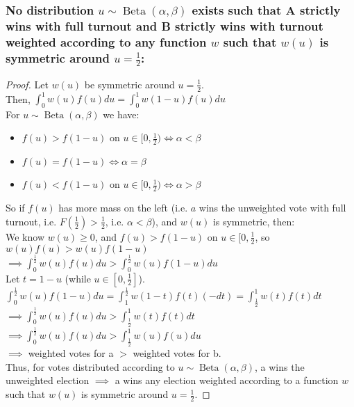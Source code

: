 \documentclass[12pt]{article}
\begin{document}
\subsubsection*{No distribution $u \sim \operatorname{Beta}(\alpha, \beta)$ exists such that A strictly wins with full turnout and B strictly wins with turnout weighted according to any function $w$ such that $w(u)$ is symmetric around $u = \frac{1}{2}$:}
\begin{proof}
    \setlength{\baselineskip}{12pt}
    \setlength{\lineskip}{3.5pt}
    \setlength{\lineskiplimit}{2pt}
    Let $w(u)$ be symmetric around $u = \frac{1}{2}$. \\
    Then, $\int_0^1w(u)f(u)du = \int_0^1w(1 - u)f(u)du$ \\
    For $u \sim \operatorname{Beta}(\alpha, \beta)$ we have:
    \begin{itemize}[nolistsep]
        \item $f(u) > f(1 - u)$ on $u \in [0, \frac{1}{2}) \iff \alpha < \beta$
        \item $f(u) = f(1 - u) \iff \alpha = \beta$
        \item $f(u) < f(1 - u)$ on $u \in [0, \frac{1}{2}) \iff \alpha > \beta$
    \end{itemize}
    So if $f(u)$ has more mass on the left (i.e. $a$ wins the unweighted vote with full turnout, i.e. $F(\frac{1}{2}) > \frac{1}{2}$, i.e. $ \alpha < \beta$), and $w(u)$ is symmetric, then: \\
    We know $w(u) \geq 0$, and $f(u) > f(1 - u)$ on $u \in [0, \frac{1}{2}$, so $w(u)f(u) > w(u)f(1 - u)$ \\
    $\implies \int_0^{\frac{1}{2}}w(u)f(u)du > \int_0^{\frac{1}{2}}w(u)f(1 - u)du$ \\
    Let $t = 1 - u$ (while $u \in [0, \frac{1}{2}]$). $\int_0^{\frac{1}{2}}w(u)f(1 - u)du = \int_1^{\frac{1}{2}}w(1 - t)f(t)(-dt) = \int^1_{\frac{1}{2}}w(t)f(t)dt$ \\
    $\implies \int_0^{\frac{1}{2}}w(u)f(u)du > \int^1_{\frac{1}{2}}w(t)f(t)dt$ \\
    $\implies \int_0^{\frac{1}{2}}w(u)f(u)du > \int^1_{\frac{1}{2}}w(u)f(u)du$ \\
    $\implies$ weighted votes for a $>$ weighted votes for b. \\
    Thus, for votes distributed according to $u \sim \operatorname{Beta}(\alpha, \beta)$, a wins the unweighted election $\implies$ a wins any election weighted according to a function $w$ such that $w(u)$ is symmetric around $u = \frac{1}{2}$.
\end{proof}
\end{document}
